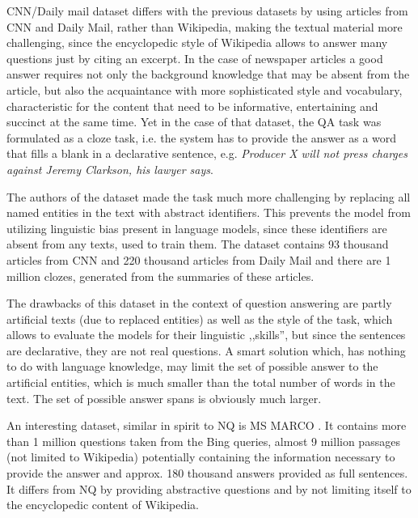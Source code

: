 \documentclass{IOS-Book-Article}
\begin{document}
CNN/Daily mail dataset \cite{hermann2015teaching} differs with the previous datasets by using articles from CNN and Daily Mail, rather than Wikipedia, making the textual material more challenging, since the encyclopedic style of Wikipedia allows to answer many questions just by citing an excerpt. In the case of newspaper articles a good answer requires not only the background knowledge that may be absent from the article, but also the acquaintance with more
sophisticated style and vocabulary, characteristic for the content that need to be informative, entertaining and succinct at the same time. Yet in the case of that dataset, the QA task was formulated as a cloze task, i.e. the system has to provide the answer as a word that fills a blank in a declarative sentence, e.g. \textit{Producer X will not press charges against Jeremy Clarkson, his lawyer says}.

The authors of the dataset made the task much more challenging by replacing all named entities in the text with abstract identifiers. This prevents the model from utilizing linguistic bias present in language models, since these identifiers are absent from any texts, used to train them. The dataset
contains 93 thousand articles from CNN and 220 thousand articles from Daily Mail and there are 1 million clozes, generated from the summaries of these articles.

The drawbacks of this dataset in the context of question answering are partly artificial texts (due to replaced entities) as well as the style of the task, which allows to evaluate the models for their linguistic ,,skills'', but since the sentences are declarative, they are not real questions. A smart solution which, has nothing to do with language knowledge, may limit the set of possible answer to the artificial entities, which is much smaller than the total number of words in the text. The set of  possible answer spans is obviously much larger.

An interesting dataset, similar in spirit to NQ is MS MARCO \cite{bajaj2016ms}. It contains more than 1 million questions taken from the Bing queries, almost 9 million passages (not limited to Wikipedia) potentially containing the information necessary to provide the answer and approx. 180 thousand answers provided as full sentences. It differs from NQ by providing abstractive questions and by not limiting itself to the encyclopedic content of Wikipedia.
\end{document}
